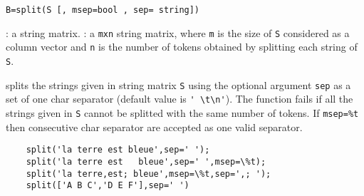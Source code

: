 
\begin{mandesc}
\end{mandesc}
\begin{calling_sequence}
\begin{verbatim}
B=split(S [, msep=bool , sep= string]) 
\end{verbatim}
\end{calling_sequence}

\begin{parameters}
  \begin{varlist}
    : a string matrix.
    : a \verb+mxn+ string matrix, where \verb+m+ is the size 
    of \verb+S+ considered as a column vector and \verb+n+ is the number 
    of tokens obtained by splitting each string of \verb+S+.
  \end{varlist}
\end{parameters}

\begin{mandescription}
splits the strings given in string matrix \verb+S+
using the optional argument \verb+sep+ as a set of one char separator 
(default value is \verb+' \t\n'+). The function fails if all the 
strings given in \verb+S+ cannot be splitted with the same number of tokens. 
If \verb+msep=%t+ then consecutive char
separator are accepted as one valid separator. 
\end{mandescription}

\begin{examples}
  \begin{Verbatim}
    split('la terre est bleue',sep=' ');
    split('la terre est   bleue',sep=' ',msep=\%t);
    split('la terre,est; bleue',msep=\%t,sep=',; ');
    split(['A B C','D E F'],sep=' ')
  \end{Verbatim}
\end{examples}


